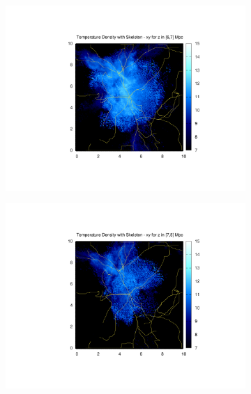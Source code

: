 \documentclass[journal]{IEEEtran}
\begin{document}
\begin{figure}[!t]
\begin{subfigure}[t]{0.3\textwidth}
		\includegraphics[width=\linewidth]{TempDenSkel07}
	\end{subfigure}
	\quad
	\begin{subfigure}[t]{0.3\textwidth}
		\centering
		\includegraphics[width=\linewidth]{TempDenSkel08}
	\end{subfigure}
	\quad
	\begin{subfigure}[t]{0.3\textwidth}
		\centering

\end{subfigure}
\end{figure}
\end{document}
